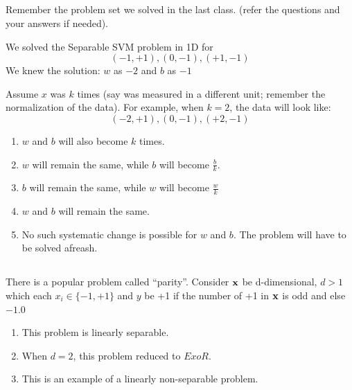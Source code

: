 \begin{frame}
\section{}
Remember the problem set we solved in the last class. (refer the questions and your answers if needed).

We solved the Separable SVM problem in 1D for
\[ (-1,+1), (0,-1), (+1,-1) \]
We knew the solution:  $w$ as $-2$ and $b$ as $-1$

Assume $x$ was $k$ times (say was measured in a different unit; remember the normalization of the data). For example, when $k=2$, the data will look like:
\[ (-2,+1), (0,-1), (+2,-1) \]

\begin{enumerate}[label=(\Alph*)]
\item $w$ and $b$ will also become $k$ times.
\item $w$ will remain the same, while $b$ will become $\frac bk$.
\item $b$ will remain the same, while $w$ will become $\frac wk$    %
\item $w$ and $b$ will remain the same.
\item No such systematic change is possible for $w$ and $b$. The problem will have to be solved afreash.
\end{enumerate}
\end{frame}

\begin{frame}
\section{}
There is a popular problem called ``parity''. Consider ${\bf x}$ be d-dimensional, $d>1$ which each $x_i\in \{-1,+1\}$ and $y$ be +1 if the number of +1 in ${\bf x}$ is odd and else $-1$.0
\begin{enumerate}[label=(\Alph*)]
\item This problem is linearly separable.
\item When $d=2$, this problem reduced to $ExoR$.    %
\item This is an example of a linearly non-separable problem.    %
\end{enumerate}
\end{frame}

